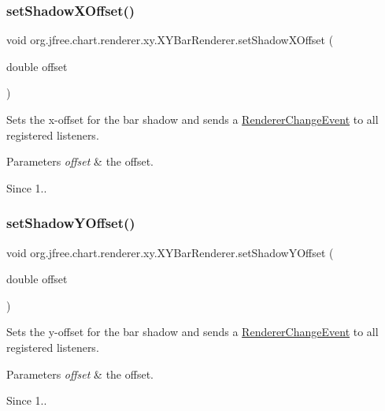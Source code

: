 \subsubsection{\texorpdfstring{set\+Shadow\+X\+Offset()}{setShadowXOffset()}}
{\footnotesize\ttfamily void org.\+jfree.\+chart.\+renderer.\+xy.\+X\+Y\+Bar\+Renderer.\+set\+Shadow\+X\+Offset (\begin{DoxyParamCaption}\item[{double}]{offset }\end{DoxyParamCaption})}

Sets the x-\/offset for the bar shadow and sends a \mbox{\hyperlink{}{Renderer\+Change\+Event}} to all registered listeners.


\begin{DoxyParams}{Parameters}
{\em offset} & the offset.\\
\hline
\end{DoxyParams}
\begin{DoxySince}{Since}
1.. 
\end{DoxySince}
\mbox{\label{classorg_1_1jfree_1_1chart_1_1renderer_1_1xy_1_1_x_y_bar_renderer_a026c8212fcf14adaf78c724e0fa1d878}} 
\subsubsection{\texorpdfstring{set\+Shadow\+Y\+Offset()}{setShadowYOffset()}}
{\footnotesize\ttfamily void org.\+jfree.\+chart.\+renderer.\+xy.\+X\+Y\+Bar\+Renderer.\+set\+Shadow\+Y\+Offset (\begin{DoxyParamCaption}\item[{double}]{offset }\end{DoxyParamCaption})}

Sets the y-\/offset for the bar shadow and sends a \mbox{\hyperlink{}{Renderer\+Change\+Event}} to all registered listeners.


\begin{DoxyParams}{Parameters}
{\em offset} & the offset.\\
\hline
\end{DoxyParams}
\begin{DoxySince}{Since}
1.. 
\end{DoxySince}
\mbox{\label{classorg_1_1jfree_1_1chart_1_1renderer_1_1xy_1_1_x_y_bar_renderer_af327f26a4813ff9cd15872b48a184042}} 
